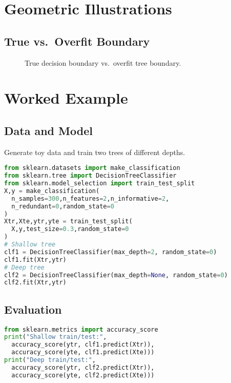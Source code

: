 \documentclass[11pt]{article}
\begin{document}
\section{Geometric Illustrations}
\subsection{True vs.\ Overfit Boundary}
\begin{figure}[h]
\centering
{}
\caption{True decision boundary vs.\ overfit tree boundary.}
\end{figure}

\section{Worked Example}
\subsection{Data and Model}
Generate toy data and train two trees of different depths.
\begin{lstlisting}[language=Python]
from sklearn.datasets import make_classification
from sklearn.tree import DecisionTreeClassifier
from sklearn.model_selection import train_test_split
X,y = make_classification(
  n_samples=300,n_features=2,n_informative=2,
  n_redundant=0,random_state=0
)
Xtr,Xte,ytr,yte = train_test_split(
  X,y,test_size=0.3,random_state=0
)
# Shallow tree
clf1 = DecisionTreeClassifier(max_depth=2, random_state=0)
clf1.fit(Xtr,ytr)
# Deep tree
clf2 = DecisionTreeClassifier(max_depth=None, random_state=0)
clf2.fit(Xtr,ytr)
\end{lstlisting}

\subsection{Evaluation}
\begin{lstlisting}[language=Python]
from sklearn.metrics import accuracy_score
print("Shallow train/test:",
  accuracy_score(ytr, clf1.predict(Xtr)),
  accuracy_score(yte, clf1.predict(Xte)))
print("Deep train/test:",
  accuracy_score(ytr, clf2.predict(Xtr)),
  accuracy_score(yte, clf2.predict(Xte)))
\end{lstlisting}
\end{document}
